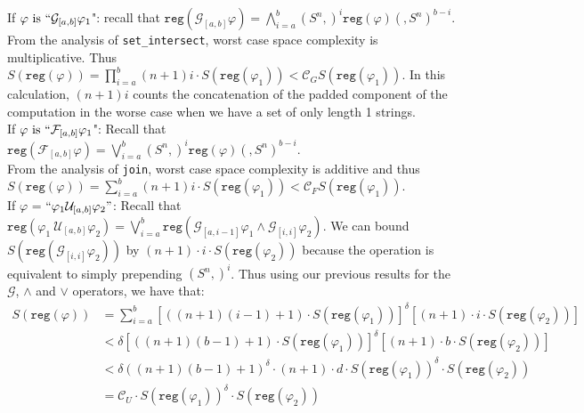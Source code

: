 \documentclass[runningheads]{llncs}
\renewcommand{\phi}{\varphi}
\begin{document}
\begin{flushleft}
\hspace{3mm} If $\phi \text{ is } ``\mathcal{G}_{[a,b]} \phi_{1}$":
recall that $\texttt{reg}(\mathcal{G}_{[a,b]} \phi) = \bigwedge_{i=a}^{b} (S^n,)^i \texttt{reg}(\phi) (,S^n)^{b-i}$.
From the analysis of \texttt{set\_intersect}, worst case space complexity is multiplicative. Thus\\ $S(\texttt{reg}(\phi)) = \prod_{i=a}^{b} (n+1)i \cdot S(\texttt{reg}(\phi_{1})) < \mathcal{C}_G S(\texttt{reg}(\phi_1))$.
In this calculation, $(n+1)i$ counts the concatenation of the padded component of the computation in the worse case when we have a set of only length 1 strings. \\
\hspace{3mm} If $\phi \text{ is } ``\mathcal{F}_{[a,b]} \phi_{1}$":
Recall that $\texttt{reg}(\mathcal{F}_{[a,b]} \phi) = \bigvee_{i=a}^{b} (S^n,)^i \texttt{reg}(\phi)(,S^n)^{b-i}$. \\
From the analysis of \texttt{join}, worst case space complexity is additive and thus 
$S(\texttt{reg}(\phi)) = \sum_{i=a}^{b} (n+1)i \cdot S(\texttt{reg}(\phi_{1})) < \mathcal{C}_{F} S(\texttt{reg}(\phi_1))$.\\
\hspace{3mm}If $\phi$ = $``\phi_1 \mathcal{U}_{[a, b]} \phi_2"$: Recall that
    $\texttt{reg}(\phi_1 \ \mathcal{U}_{[a,b]} \phi_2) =  \bigvee_{i=a}^{b} \texttt{reg}\left(\mathcal{G}_{[a,i-1]}\phi_1 \land \mathcal{G}_{[i, i]} \phi_2\right)$.
    We can bound $S(\texttt{reg}(\mathcal{G}_{[i, i]} \phi_2))$ by $(n+1) \cdot i \cdot S(\texttt{reg}(\phi_2))$ because the operation is equivalent to simply prepending $(S^n ,)^i$.
    Thus using our previous results for the $\mathcal{G}$, $\land$ and $\lor$ operators, we have that:
    {\setlength{\abovedisplayskip}{0pt}\setlength{\belowdisplayskip}{0pt}
    \begin{align*}
        S(\texttt{reg}(\phi)) &= 
        \sum_{i = a}^b [((n+1)(i-1) + 1) \cdot S(\texttt{reg}(\phi_1))]^\delta 
        [(n+1) \cdot i \cdot S(\texttt{reg}(\phi_2))] \\
        &< \delta [((n+1)(b-1) + 1) \cdot S(\texttt{reg}(\phi_1))]^\delta 
        [(n+1) \cdot b \cdot S(\texttt{reg}(\phi_2))] \\
        &< \delta ((n+1)(b-1) + 1)^\delta \cdot (n+1) \cdot d \cdot S(\texttt{reg}(\phi_1))^\delta \cdot S(\texttt{reg}(\phi_2)) \\
        &= \mathcal{C}_U \cdot S(\texttt{reg}(\phi_1))^\delta \cdot S(\texttt{reg}(\phi_2))
    \end{align*}}

\end{flushleft}
\end{document}

